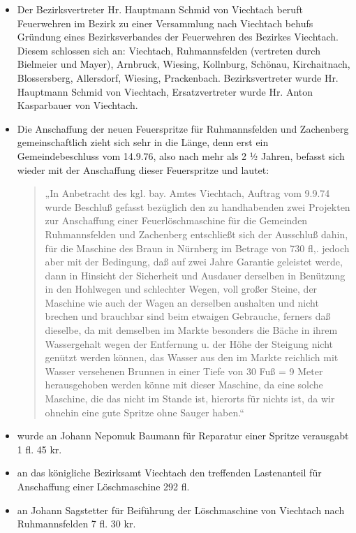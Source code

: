\documentclass[12pt,a4paper]{book}
\begin{document}
\begin{itemize}
\item Der Bezirksvertreter Hr. Hauptmann Schmid von Viechtach beruft
Feuerwehren im Bezirk zu einer Versammlung nach Viechtach behufs
Gründung eines Bezirksverbandes der Feuerwehren des Bezirkes Viechtach.
Diesem schlossen sich an: Viechtach, Ruhmannsfelden (vertreten durch
Bielmeier und Mayer), Arnbruck, Wiesing, Kollnburg, Schönau,
Kirchaitnach, Blossersberg, Allersdorf, Wiesing, Prackenbach.
Bezirksvertreter wurde Hr. Hauptmann Schmid von Viechtach,
Ersatzvertreter wurde Hr. Anton Kasparbauer von Viechtach.

\item Die Anschaffung der neuen Feuerspritze für Ruhmannsfelden und
Zachenberg gemeinschaftlich zieht sich sehr in die Länge, denn erst ein
Gemeindebeschluss vom 14.9.76, also nach mehr als 2 ½ Jahren, befasst
sich wieder mit der Anschaffung dieser Feuerspritze und lautet:

\begin{quote}
„In Anbetracht des kgl. bay. Amtes Viechtach, Auftrag vom 9.9.74 wurde
Beschluß gefasst bezüglich den zu handhabenden zwei Projekten zur
Anschaffung einer Feuerlöschmaschine für die Gemeinden Ruhmannsfelden
und Zachenberg entschließt sich der Ausschluß dahin, für die Maschine
des Braun in Nürnberg im Betrage von 730 fl,. jedoch aber mit der
Bedingung, daß auf zwei Jahre Garantie geleistet werde, dann in Hinsicht
der Sicherheit und Ausdauer derselben in Benützung in den Hohlwegen und
schlechter Wegen, voll großer Steine, der Maschine wie auch der Wagen an
derselben aushalten und nicht brechen und brauchbar sind beim etwaigen
Gebrauche, ferners daß dieselbe, da mit demselben im Markte besonders
die Bäche in ihrem Wassergehalt wegen der Entfernung u. der Höhe der
Steigung nicht genützt werden können, das Wasser aus den im Markte
reichlich mit Wasser versehenen Brunnen in einer Tiefe von 30 Fuß = 9
Meter herausgehoben werden könne mit dieser Maschine, da eine solche
Maschine, die das nicht im Stande ist, hierorts für nichts ist, da wir
ohnehin eine gute Spritze ohne Sauger haben.“
\end{quote}

\item wurde an Johann Nepomuk Baumann für Reparatur einer Spritze
verausgabt 1 fl. 45 kr.

\item an das königliche Bezirksamt Viechtach den treffenden Lastenanteil
für Anschaffung einer Löschmaschine 292 fl.

\item an Johann Sagstetter für Beiführung der Löschmaschine von
Viechtach nach Ruhmannsfelden 7 fl. 30 kr.
\end{itemize}
\end{document}
